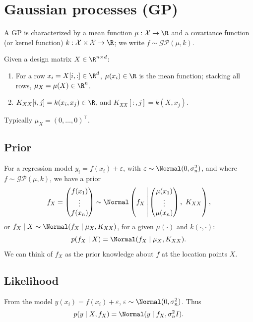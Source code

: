 \section{Gaussian processes (GP)}
A GP is characterized by a mean function $\mu : \mathcal{X} \to \R$ and a covariance function (or kernel function) $k : \mathcal{X}\times\mathcal{X} \to \R$; we write $f \sim \mathcal{GP}(\mu, k)$.

Given a design matrix $X \in \R^{n\times d}$:
\begin{enumerate}
\item For a row $x_i = X[i,:] \in \R^d$, $\mu(x_i) \in \R$ is the mean function; stacking all rows, $\mu_X = \mu(X) \in \R^n$.
\item $K_{XX}[i,j] = k(x_i, x_j) \in \R$, and $K_{XX}[:,j] = k(X, x_j)$.
\end{enumerate}
Typically $\mu_X = (0, \dots, 0)^{\top}$.

\subsection{Prior}
For a regression model $y_i = f(x_i) + \varepsilon$, with $\varepsilon \sim \Normal(0, \sigma_n^2)$, and where $f \sim \mathcal{GP}(\mu, k)$, we have a prior
\[
f_X = \begin{pmatrix}f(x_1)\\ \vdots\\ f(x_n)\end{pmatrix} \sim \Normal\left(f_X \,\middle|\, \begin{pmatrix}\mu(x_1)\\ \vdots\\ \mu(x_n)\end{pmatrix},\ K_{XX}\right),
\]
or $f_X \mid X \sim \Normal(f_X \mid \mu_X, K_{XX})$, for a given $\mu(\cdot)$ and $k(\cdot,\cdot)$:
\[
p(f_X \mid X) = \Normal(f_X \mid \mu_X, K_{XX}).
\]
We can think of $f_X$ as the prior knowledge about $f$ at the location points $X$.

\subsection{Likelihood}
From the model $y(x_i) = f(x_i) + \varepsilon$, $\varepsilon \sim \Normal(0, \sigma_n^2)$. Thus
\[
p(y \mid X, f_X) = \Normal(y \mid f_X, \sigma_n^2 I).
\]


